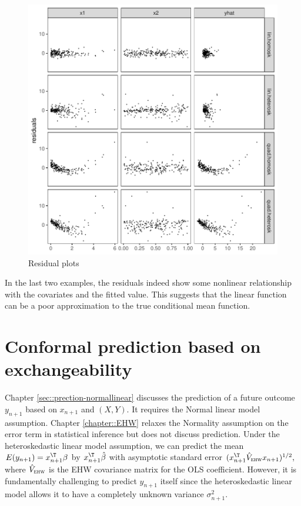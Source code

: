 \begin{figure}[th]
\centering
\includegraphics[width = \textwidth]{figures/residualplots.pdf}
\caption{Residual plots}\label{fig::residual-plots}
\end{figure}



In the last two examples, the residuals indeed show some nonlinear relationship with the covariates and the fitted value. This suggests that the linear function can be a poor approximation to the true conditional mean function. 



\section{Conformal prediction based on exchangeability}\label{sec::conformal-prediction}


Chapter \ref{sec::prection-normallinear} discusses the prediction of a future outcome $y_{n+1}$ based on $x_{n+1}$ and $(X,Y)$. It requires the Normal linear model assumption. Chapter \ref{chapter::EHW} relaxes the Normality assumption on the error term in statistical inference but does not discuss prediction. Under the heteroskedastic linear model assumption, we can predict the mean $E(y_{n+1}) = x_{n+1}^{\T} \beta$ by $x_{n+1}^{\T} \hat\beta$ with asymptotic standard error
$
( x_{n+1}^{\T}  \hat{V}_{\textsc{ehw}}  x_{n+1} )^{1/2},
$
where $ \hat{V}_{\textsc{ehw}}$ is the EHW covariance matrix for the OLS coefficient. However, it is fundamentally challenging to predict $y_{n+1}$ itself since the heteroskedastic linear model allows it to have a completely unknown variance $\sigma^2_{n+1}$. 



